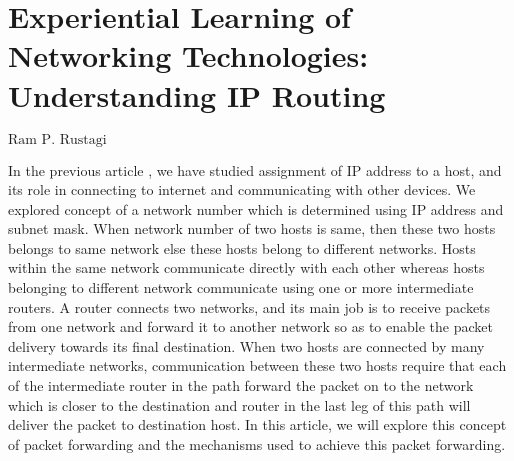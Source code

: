 \chapter{Experiential Learning of Networking Technologies: Understanding IP Routing}

\begin{center}
{\large\uppercase{$\text{Ram P. Rustagi}$}} 


\vskip -6pt

\end{center}

\vskip 2cm




\vfill




\newpage

\begin{multicols}{2}

In the previous article \cite{art2-key01}, we have studied assignment of IP address \cite{art2-key02} to a host, and its role in connecting to internet and communicating with other devices. We explored concept of a network number which is determined using IP address and subnet mask. When network number of two hosts is same, then these two hosts belongs to same network else these hosts belong to different networks. Hosts within the same network communicate directly with each other whereas hosts belonging to different network communicate using one or more intermediate routers. A router connects two networks, and its main job is to receive packets from one network and forward it to another network so as to enable the packet delivery towards its final destination. When two hosts are connected by many intermediate networks, communication between these two hosts require that each of the intermediate router in the path forward the packet on to the network which is closer to the destination and router in the last leg of this path will deliver the packet to destination host. In this article, we will explore this concept of packet forwarding and the mechanisms used to achieve this packet forwarding.


\end{multicols}
